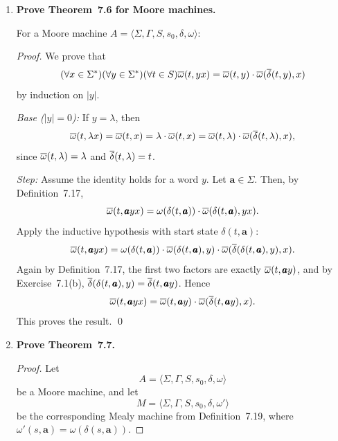 \begin{enumerate}[{7.}1.]
\begin{enumerate}[(a)]
\begin{proof}
  $(\Leftarrow)$ Suppose $s E_{iM} t$ and
  $\delta(s,\pmb{a}) E_{iM}\delta(t,\pmb{a})$ for every $\pmb{a}\in\Sigma$.
  Let $w\in\Sigma^*$ with $|w|\le i+1$.  If $|w|\le i$, then
  $\OBAR(s,w)=\OBAR(t,w)$ because $s E_{iM}t$.  Otherwise write
  $w=\pmb{a}y$, where $|y|\le i$.  Since $i\ge1$, $s E_{iM}t$ implies
  $s E_{1M}t$, so $\omega(s,\pmb{a})=\omega(t,\pmb{a})$.  Also,
  $\delta(s,\pmb{a}) E_{iM}\delta(t,\pmb{a})$ gives
  $\OBAR(\delta(s,\pmb{a}),y)=\OBAR(\delta(t,\pmb{a}),y)$.  Therefore, by
  Definition~7.2,
  \[
  \OBAR(s,\pmb{a}y)
  =\omega(s,\pmb{a})\cdot\OBAR(\delta(s,\pmb{a}),y)
  =\omega(t,\pmb{a})\cdot\OBAR(\delta(t,\pmb{a}),y)
  =\OBAR(t,\pmb{a}y).
  \]
  Thus $s E_{i+1,M} t$. \qed
  \end{proof}
\end{enumerate}

\item \textbf{Prove Theorem~7.6 for Moore machines.}

For a Moore machine $A=\langle\Sigma,\Gamma,S,s_0,\delta,\omega\rangle$:

\begin{proof}
We prove that
\[
  (\forall x\in\Sigma^*)(\forall y\in\Sigma^*)(\forall t\in S) 
  \overline{\omega}(t,yx)=\overline{\omega}(t,y)\cdot\overline{\omega}(\overline{\delta}(t,y),x)
\]
by induction on $|y|$.

\emph{Base ($|y|=0$):} If $y=\lambda$, then
\[
  \overline{\omega}(t,\lambda x)=\overline{\omega}(t,x)=\lambda\cdot\overline{\omega}(t,x)
  =\overline{\omega}(t,\lambda)\cdot\overline{\omega}(\overline{\delta}(t,\lambda),x),
\]
since $\overline{\omega}(t,\lambda)=\lambda$ and $\overline{\delta}(t,\lambda)=t$.

\emph{Step:} Assume the identity holds for a word $y$.  Let $\pmb{a}\in\Sigma$.
Then, by Definition~7.17,
\[
  \overline{\omega}(t,\pmb{a}yx)
  =\omega(\delta(t,\pmb{a}))\cdot\overline{\omega}(\delta(t,\pmb{a}),yx).
\]
Apply the inductive hypothesis with start state $\delta(t,\pmb{a})$:
\[
  \overline{\omega}(t,\pmb{a}yx)
  =\omega(\delta(t,\pmb{a}))\cdot\overline{\omega}(\delta(t,\pmb{a}),y)\cdot
    \overline{\omega}(\overline{\delta}(\delta(t,\pmb{a}),y),x).
\]
Again by Definition~7.17, the first two factors are exactly
$\overline{\omega}(t,\pmb{a}y)$, and by Exercise~7.1(b),
$\overline{\delta}(\delta(t,\pmb{a}),y)=\overline{\delta}(t,\pmb{a}y)$.  Hence
\[
  \overline{\omega}(t,\pmb{a}yx)=\overline{\omega}(t,\pmb{a}y)\cdot\overline{\omega}(\overline{\delta}(t,\pmb{a}y),x).
\]
This proves the result. \qed
\end{proof}

\item \textbf{Prove Theorem~7.7.}

\begin{proof}
Let
\[
  A=\langle\Sigma,\Gamma,S,s_0,\delta,\omega\rangle
\]
be a Moore machine, and let
\[
  M=\langle\Sigma,\Gamma,S,s_0,\delta,\omega'\rangle
\]
be the corresponding Mealy machine from Definition~7.19, where
$\omega'(s,\pmb{a})=\omega(\delta(s,\pmb{a}))$.


\end{proof}
\end{enumerate}
